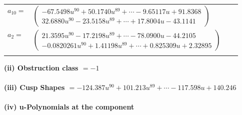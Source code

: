 \documentclass[1p]{elsarticle_modified}
\theoremstyle{definition}
\begin{document}
\begin{tabular}{m{7pt} m{180pt} m{7pt} m{180pt} }
\flushright $a_{10}=$&$\begin{pmatrix}-67.5498 u^{90}+50.1740 u^{89}+\cdots-9.65117 u+91.8368\\32.6880 u^{90}-23.5158 u^{89}+\cdots+17.8004 u-43.1141\end{pmatrix}$ \\
\flushright $a_{2}=$&$\begin{pmatrix}21.3595 u^{90}-17.2198 u^{89}+\cdots-78.0900 u-44.2105\\-0.0820261 u^{90}+1.41198 u^{89}+\cdots+0.825309 u+2.32895\end{pmatrix}$\\&\end{tabular}
\flushleft \textbf{(ii) Obstruction class $= -1$}\\~\\
\flushleft \textbf{(iii) Cusp Shapes $= -124.387 u^{90}+101.213 u^{89}+\cdots-117.598 u+140.246$}\\~\\
\newpage\renewcommand{\arraystretch}{1}
\flushleft \textbf{(iv) u-Polynomials at the component}\newline \\
\end{document}
